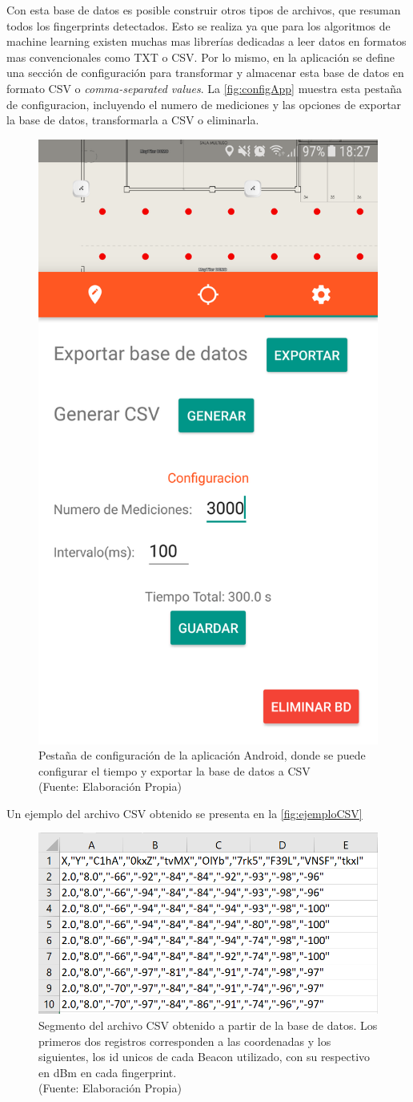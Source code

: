 Con esta base de datos es posible construir otros tipos de archivos, que resuman todos los fingerprints detectados. Esto se realiza ya que para los algoritmos de machine learning existen muchas mas librerías dedicadas a leer datos en formatos mas convencionales como TXT o CSV. Por lo mismo, en la aplicación se define una sección de configuración para transformar y almacenar esta base de datos en formato CSV o \textit{comma-separated values}.  La \autoref{fig:configApp} muestra esta pestaña de configuracion, incluyendo el numero de mediciones y las opciones de exportar la base de datos, transformarla a CSV o eliminarla.

\begin{figure}[ht!]
\centering
\includegraphics[width=.3\textwidth]{figures/configApp.png}
\caption[abs]{Pestaña de configuración de la aplicación Android, donde se puede configurar el tiempo y exportar la base de datos a CSV\\
{\scriptsize (Fuente: Elaboración Propia)}}
\label{fig:configApp}
\end{figure}


Un ejemplo del archivo CSV obtenido se presenta en la \autoref{fig:ejemploCSV}


\begin{figure}[ht!]
\centering
\includegraphics[width=.6\textwidth]{figures/ejemplo_csv.png}
\caption[abs]{Segmento del archivo CSV obtenido a partir de la base de datos. Los primeros dos registros corresponden a las coordenadas y los siguientes, los id unicos de cada Beacon utilizado, con su respectivo en dBm en cada fingerprint. \\
{\scriptsize (Fuente: Elaboración Propia)}}
\label{fig:ejemploCSV}
\end{figure}

